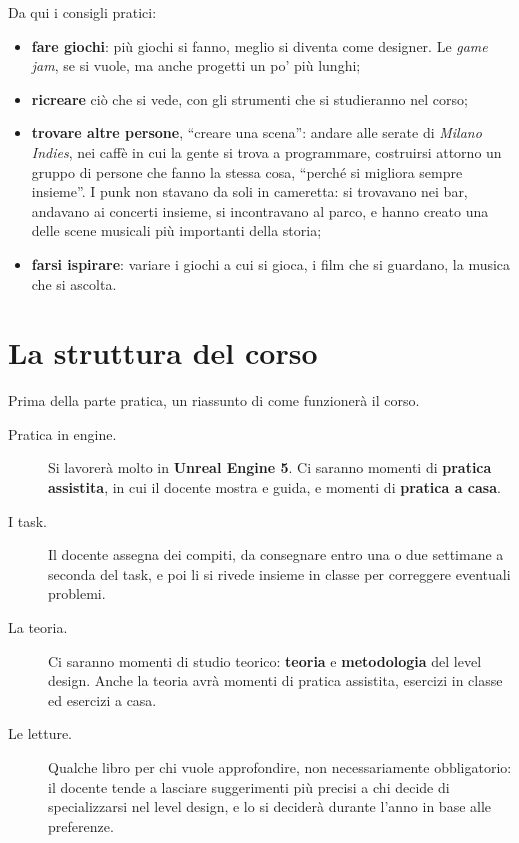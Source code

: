 Da qui i consigli pratici:
\begin{itemize}
  \item \textbf{fare giochi}: più giochi si fanno, meglio si diventa come
        designer. Le \emph{game jam}, se si vuole, ma anche progetti un po'
        più lunghi;
  \item \textbf{ricreare} ciò che si vede, con gli strumenti che si
        studieranno nel corso;
  \item \textbf{trovare altre persone}, ``creare una scena'': andare alle
        serate di \emph{Milano Indies}, nei caffè in cui la gente si trova a
        programmare, costruirsi attorno un gruppo di persone che fanno la
        stessa cosa, ``perché si migliora sempre insieme''. I punk non
        stavano da soli in cameretta: si trovavano nei bar, andavano ai
        concerti insieme, si incontravano al parco, e hanno creato una delle
        scene musicali più importanti della storia;
  \item \textbf{farsi ispirare}: variare i giochi a cui si gioca, i film
        che si guardano, la musica che si ascolta.
\end{itemize}

\section{La struttura del corso}
\label{gd8:sec:struttura}

Prima della parte pratica, un riassunto di come funzionerà il corso.
\begin{description}
  \item[Pratica in engine.] Si lavorerà molto in \textbf{Unreal Engine 5}.
        Ci saranno momenti di \textbf{pratica assistita}, in cui il docente
        mostra e guida, e momenti di \textbf{pratica a casa}.
  \item[I task.] Il docente assegna dei compiti, da consegnare entro una o
        due settimane a seconda del task, e poi li si rivede insieme in
        classe per correggere eventuali problemi.
  \item[La teoria.] Ci saranno momenti di studio teorico: \textbf{teoria} e
        \textbf{metodologia} del level design. Anche la teoria avrà momenti
        di pratica assistita, esercizi in classe ed esercizi a casa.
  \item[Le letture.] Qualche libro per chi vuole approfondire, non
        necessariamente obbligatorio: il docente tende a lasciare
        suggerimenti più precisi a chi decide di specializzarsi nel level
        design, e lo si deciderà durante l'anno in base alle preferenze.
\end{description}

